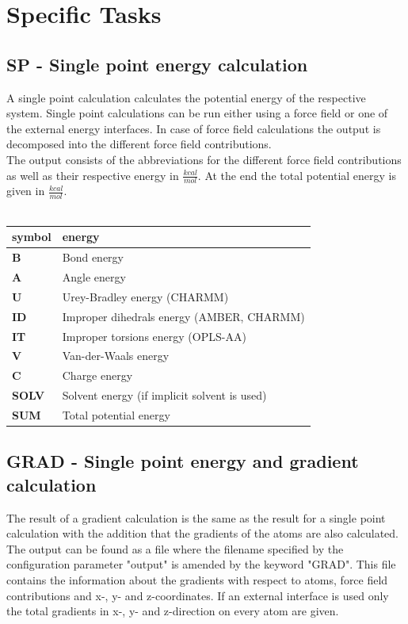 \documentclass[10pt,a4paper]{article} %
\begin{document}
	\newpage

	\section{Specific Tasks}

	\subsection{SP - Single point energy calculation}
	A single point calculation calculates the potential energy of the respective system. Single point calculations can be run either using a force field or one of the external energy interfaces. In case of force field calculations the output is decomposed into the different force field contributions.\\

	The output consists of the abbreviations for the different force field contributions as well as their respective energy in $\frac{kcal}{mol}$. At the end the total potential energy is given in $\frac{kcal}{mol}$.\\~\\

	\begin{longtable}{l|l}
		symbol & energy\\
		\hline
		\textbf{B} & Bond energy\\
		\textbf{A} & Angle energy\\
		\textbf{U} & Urey-Bradley energy (\ac{CHARMM})\\
		\textbf{ID} & Improper dihedrals energy (\ac{AMBER}, \ac{CHARMM})\\
		\textbf{IT} & Improper torsions energy (\ac{OPLS-AA})\\
		\textbf{V} & Van-der-Waals energy\\
		\textbf{C} & Charge energy\\
		\textbf{SOLV} & Solvent energy (if implicit solvent is used)\\
		\textbf{SUM} & Total potential energy\\

	\end{longtable}


	\subsection{GRAD - Single point energy and gradient calculation}
	The result of a gradient calculation is the same as the result for a single point calculation with the addition that the gradients of the atoms are also calculated. The output can be found as a file where the filename specified by the configuration parameter "output" is amended by the keyword "GRAD". This file contains the information about the gradients with respect to atoms, force field contributions and x-, y- and z-coordinates. If an external interface is used only the total gradients in x-, y- and z-direction on every atom are given.
	
\end{document}
